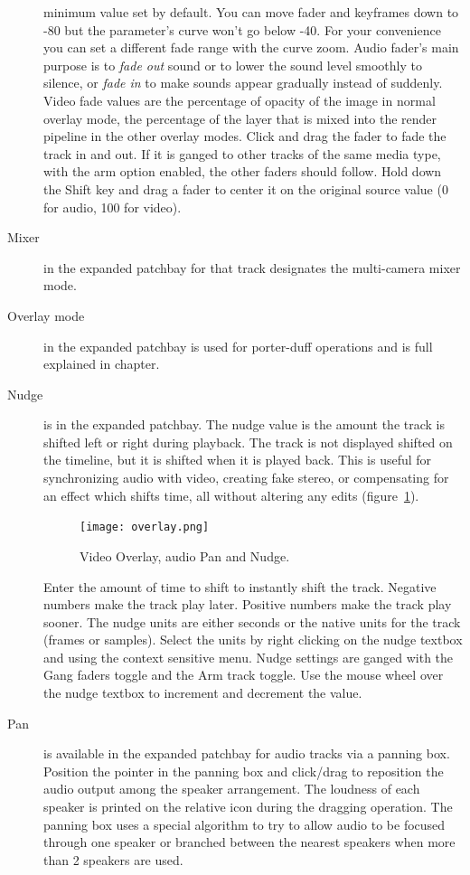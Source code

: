 \begin{description}
  minimum value set by default.  You can move fader and keyframes down
  to -80 but the parameter's curve won't go below -40.  For your
  convenience you can set a different fade range with the curve zoom.
  Audio fader’s main purpose is to \textit{fade out} sound or to lower
  the sound level smoothly to silence, or \textit{fade in} to make
  sounds appear gradually instead of suddenly.  Video fade values are
  the percentage of opacity of the image in normal overlay mode, the
  percentage of the layer that is mixed into the render pipeline in
  the other overlay modes.  Click and drag the fader to fade the track
  in and out.  If it is ganged to other tracks of the same media type,
  with the arm option enabled, the other faders should follow.  Hold
  down the Shift key and drag a fader to center it on the original
  source value (0 for audio, 100 for video).
\item[Mixer] in the expanded patchbay for that track designates
  the multi-camera mixer mode.
\item[Overlay mode] in the expanded patchbay is used for
  porter-duff operations and is full explained in
   chapter.
\item[Nudge] is in the expanded patchbay.  The nudge value is
  the amount the track is shifted left or right during playback. The
  track is not displayed shifted on the timeline, but it is shifted
  when it is played back. This is useful for synchronizing audio with
  video, creating fake stereo, or compensating for an effect which
  shifts time, all without altering any edits
  (figure~\ref{fig:overlay}).

  \begin{figure}[htpb] \centering
    \texttt{[image: overlay.png]}
    \caption{Video Overlay, audio Pan and Nudge.}
    \label{fig:overlay}
  \end{figure}

  Enter the amount of time to shift to instantly shift the
  track. Negative numbers make the track play later. Positive numbers
  make the track play sooner. The nudge units are either seconds or
  the native units for the track (frames or samples). Select the units
  by right clicking on the nudge textbox and using the context
  sensitive menu. Nudge settings are ganged with the Gang faders
  toggle and the Arm track toggle. Use the mouse wheel over the nudge
  textbox to increment and decrement the value.
\item[Pan] is available in the expanded patchbay for audio
  tracks via a panning box. Position the pointer in the panning box
  and click/drag to reposition the audio output among the speaker
  arrangement. The loudness of each speaker is printed on the relative
  icon during the dragging operation. The panning box uses a special
  algorithm to try to allow audio to be focused through one speaker or
  branched between the nearest speakers when more than 2 speakers are
  used.
\end{description}


